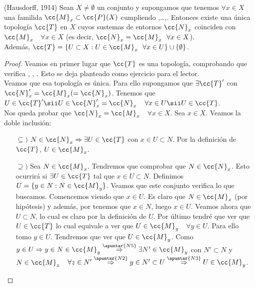 \begin{prop}
    (Hausdorff, 1914) Sean $X\neq \emptyset$ un conjunto y supongamos que tenemos $\forall x \in X$ una familida $\cc{M}_x\subset \cc{P}(X)$ cumpliendo ,\dots,. Entonces existe una única topología $\cc{T}$ en $X$ cuyos sustemas de entornos $\cc{N}_x$ coinciden con $\cc{M}_x$\ \ $\forall x \in X$ (es decir, $\cc{N}_x = \cc{M}_x\ \ \forall x \in X$).\\

    Además, $\cc{T} = \{U\subset X : U \in \cc{M}_x\ \ \forall x \in U\}\cup\{\emptyset\}$.

    \begin{proof}
        Veamos en primer lugar que $\cc{T}$ es una topología, comprobando que verifica , , . Esto se deja planteado como ejercicio para el lector.\\

        Veamos que esa topología es única. Para ello supongamos que $\exists \cc{T}'$ con $\cc{N}_x'=\cc{M}_x(=\cc{N}_x)$. Tenemos que $U\in \cc{T}' \sii U\in \cc{N}_x'=\cc{N}_x$\ \ $\forall x \in U \sii U \in \cc{T}$.\\

        Nos queda probar que $\cc{N}_x = \cc{M}_x$\ \ $\forall x \in X$. Sea $x\in X$. Veamos la doble inclusión:
        \begin{itemize}
            \item[$\subseteq)$] $N\in \cc{N}_x \Rightarrow \exists U \in \cc{T}$ con $x\in U\subset N$. Por la definición de $\cc{T}$, $U\in \cc{M}_x$.
            \item[$\supseteq)$] Sea $N\in \cc{M}_x$. Tendremos que comprobar que $N \in \cc{N}_x$. Esto ocurrirá si $\exists U\in \cc{T}$ tal que $x\in U \subset N$. Definimos $U=\{y\in N : N\in \cc{M}_y\}$. Veamos que este conjunto verifica lo que buscamos. Comencemos viendo que $x\in U$. Es claro que $N\in \cc{M}_x$ (por hipótesis) y además, por  tenemos que $x\in N$, luego $x\in U$. Veamos ahora que $U\subset N$, lo cual es claro por la definición de $U$. Por último tendré que ver que $U\in \cc{T}$ lo cual equivale a ver que $U\in \cc{M}_y$\ \ $\forall y \in U$. Para ello tomo $y\in U$. Tendremos que ver que $U\in \cc{M}_y$. Como $y\in U \Rightarrow y\in N\in \cc{M}_y \overset{\apuntar{N5}}{\Rightarrow} \exists N'\in \cc{M}_y$ con $N'\subset N$ y $N\in \cc{M}_z$\ \  $\forall z \in N' \overset{\apuntar{N2}}{\Rightarrow} y \in N' \subset U \overset{\apuntar{N3}}{\Rightarrow} U \in \cc{M}_y $.
        \end{itemize}
    \end{proof}
\end{prop}

